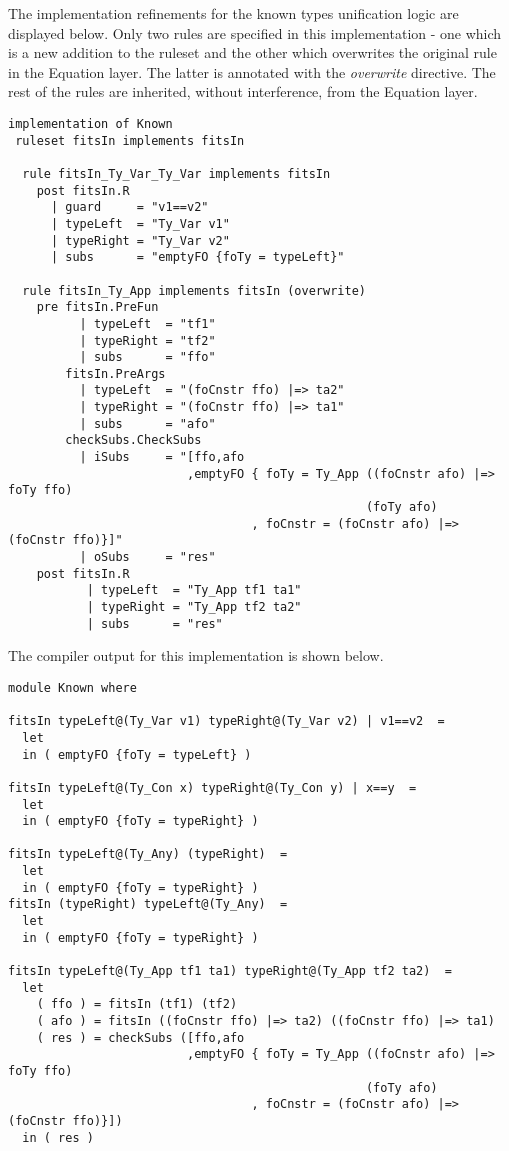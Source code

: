 \documentclass[10pt]{article}
\begin{document}
The implementation refinements for the known types unification logic are displayed below.
Only two rules are specified in this implementation - one which is a new addition to the ruleset
and the other which overwrites the original rule in the Equation layer.  The latter is annotated with the \emph{overwrite} directive.  The rest of the rules are inherited, without interference, from the Equation layer.


\begin{verbatim}
implementation of Known
 ruleset fitsIn implements fitsIn

  rule fitsIn_Ty_Var_Ty_Var implements fitsIn
    post fitsIn.R
      | guard     = "v1==v2"
      | typeLeft  = "Ty_Var v1"
      | typeRight = "Ty_Var v2"
      | subs      = "emptyFO {foTy = typeLeft}"

  rule fitsIn_Ty_App implements fitsIn (overwrite)
    pre fitsIn.PreFun
          | typeLeft  = "tf1"
          | typeRight = "tf2"
          | subs      = "ffo" 
        fitsIn.PreArgs
          | typeLeft  = "(foCnstr ffo) |=> ta2"
          | typeRight = "(foCnstr ffo) |=> ta1"
          | subs      = "afo"
        checkSubs.CheckSubs
          | iSubs     = "[ffo,afo
                         ,emptyFO { foTy = Ty_App ((foCnstr afo) |=> foTy ffo) 
                                                  (foTy afo)
                                  , foCnstr = (foCnstr afo) |=> (foCnstr ffo)}]"
          | oSubs     = "res"
    post fitsIn.R
           | typeLeft  = "Ty_App tf1 ta1"
           | typeRight = "Ty_App tf2 ta2"
           | subs      = "res"    
\end{verbatim}


The compiler output for this implementation is shown below.


\begin{verbatim}
module Known where

fitsIn typeLeft@(Ty_Var v1) typeRight@(Ty_Var v2) | v1==v2  =
  let
  in ( emptyFO {foTy = typeLeft} )

fitsIn typeLeft@(Ty_Con x) typeRight@(Ty_Con y) | x==y  =
  let
  in ( emptyFO {foTy = typeRight} )

fitsIn typeLeft@(Ty_Any) (typeRight)  =
  let
  in ( emptyFO {foTy = typeRight} )
fitsIn (typeRight) typeLeft@(Ty_Any)  =
  let
  in ( emptyFO {foTy = typeRight} )

fitsIn typeLeft@(Ty_App tf1 ta1) typeRight@(Ty_App tf2 ta2)  =
  let
    ( ffo ) = fitsIn (tf1) (tf2) 
    ( afo ) = fitsIn ((foCnstr ffo) |=> ta2) ((foCnstr ffo) |=> ta1) 
    ( res ) = checkSubs ([ffo,afo
                         ,emptyFO { foTy = Ty_App ((foCnstr afo) |=> foTy ffo) 
                                                  (foTy afo)
                                  , foCnstr = (foCnstr afo) |=> (foCnstr ffo)}]) 
  in ( res )
\end{verbatim}
\end{document}
